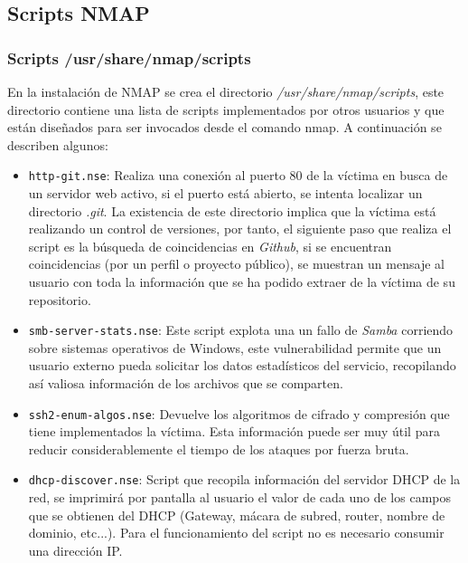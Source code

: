 \documentclass[a4,12pt,onecolum]{article}
\begin{document}

\subsection{Scripts NMAP}
\subsubsection{Scripts /usr/share/nmap/scripts}
En la instalación de NMAP se crea el directorio \textit{/usr/share/nmap/scripts}, este directorio contiene una lista de scripts implementados por otros usuarios y que están diseñados para ser invocados desde el comando nmap. A continuación se describen algunos:
\begin{itemize}
\item \texttt{http-git.nse}: Realiza una conexión al puerto 80 de la víctima en busca de un servidor web activo, si el puerto está abierto, se intenta localizar un directorio \emph{.git}. La existencia de este directorio implica que la víctima está realizando un control de versiones, por tanto, el siguiente paso que realiza el script es la búsqueda de coincidencias en \emph{Github}, si se encuentran coincidencias (por un perfil o proyecto público), se muestran un mensaje al usuario con toda la información que se ha podido extraer de la víctima de su repositorio.
\item \texttt{smb-server-stats.nse}: Este script explota una un fallo de \emph{Samba} corriendo sobre sistemas operativos de Windows, este vulnerabilidad permite que un usuario externo pueda solicitar los datos estadísticos del servicio, recopilando así valiosa información de los archivos que se comparten.
\item \texttt{ssh2-enum-algos.nse}: Devuelve los algoritmos de cifrado y compresión que tiene implementados la víctima. Esta información puede ser muy útil para reducir considerablemente el tiempo de los ataques por fuerza bruta.
\item \texttt{dhcp-discover.nse}: Script que recopila información del servidor DHCP de la red, se imprimirá por pantalla al usuario el valor de cada uno de los campos que se obtienen del DHCP (Gateway, mácara de subred, router, nombre de dominio, etc...). Para el funcionamiento del script no es necesario consumir una dirección IP.
\end{itemize}
\end{document}
